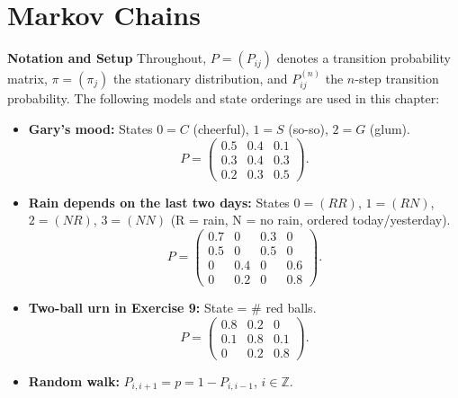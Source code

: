 \section{Markov Chains}
\label{sec:markov-chains}

\textbf{Notation and Setup}
Throughout, $P = (P_{ij})$ denotes a transition probability matrix,
$\pi = (\pi_j)$ the stationary distribution, and $P^{(n)}_{ij}$ the
$n$-step transition probability.  The following models and state orderings are used in this chapter:
\begin{itemize}
  \item \textbf{Gary's mood:} States $0=C$ (cheerful),
    $1=S$ (so-so), $2=G$ (glum).
    \[
      P=\begin{pmatrix}0.5&0.4&0.1\\0.3&0.4&0.3\\0.2&0.3&0.5\end{pmatrix}.
    \]
  \item \textbf{Rain depends on the last two days:} States
    $0=(RR)$, $1=(RN)$, $2=(NR)$, $3=(NN)$ (R = rain, N = no rain,
    ordered today/yesterday).
    \[
      P=\begin{pmatrix}0.7&0&0.3&0\\0.5&0&0.5&0\\0&0.4&0&0.6\\0&0.2&0&0.8\end{pmatrix}.
    \]
  \item \textbf{Two-ball urn in Exercise 9:} State = \# red balls.
    \[
      P=\begin{pmatrix}0.8&0.2&0\\0.1&0.8&0.1\\0&0.2&0.8\end{pmatrix}.
    \]
  \item \textbf{Random walk:}
    $P_{i,i+1}=p=1-P_{i,i-1}$, $i\in\mathbb{Z}$.
\end{itemize}

\setcounter{exercise}{0}

